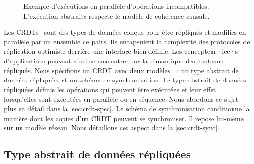 \begin{figure}[htb]
\centering
{}
\caption[Exécution en parallèle d'opérations incompatibles]{Exemple d'exécutions en parallèle d'opérations incompatibles.
L'exécution abstraite respecte le modèle de cohérence causale.}\label{fig:set-conflict-example}
\end{figure}

Les \acfp{CRDT}~\autocite{shapiro_2011_crdt,roh_2011_rga} sont des types de données conçus pour être répliqués et modifiés en parallèle par un ensemble de pairs.
Ils encapsulent la complexité des protocoles de réplication optimiste derrière une interface bien définie.
Les concepteur·ice·s d'applications peuvent ainsi se concentrer sur la sémantique des contenus répliqués.
Nous spécifions un \ac{CRDT} avec deux modèles~\autocite{preguia2018_crdt}~: un type abstrait de données répliquées et un schéma de synchronisation.
Le type abstrait de données répliquées définis les opérations qui peuvent être exécutées et leur effet lorsqu'elles sont exécutées en parallèle ou en séquence.
Nous abordons ce sujet plus en détail dans la \autoref{sec:crdt-spec}.
Le schéma de synchronisation conditionne la manière dont les copies d'un \ac{CRDT} peuvent se synchroniser.
Il repose lui-même sur un modèle réseau.
Nous détaillons cet aspect dans la \autoref{sec:crdt-sync}.

\subsection{Type abstrait de données répliquées}\label{sec:crdt-spec}

